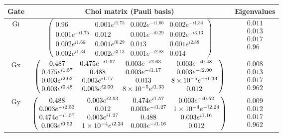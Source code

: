 {\begin{table}[h]
\begin{center}
\begin{tabular}[l]{|c|c|c|}
\hline
Gate & Choi matrix (Pauli basis) & Eigenvalues \\ \hline
Gi & $ \left(\!\!\begin{array}{cccc}
0.96 & 0.001e^{i1.75} & 0.002e^{-i1.66} & 0.002e^{-i1.34} \\ 
0.001e^{-i1.75} & 0.012 & 0.001e^{-i0.29} & 0.002e^{-i3.13} \\ 
0.002e^{i1.66} & 0.001e^{i0.29} & 0.013 & 0.001e^{i2.88} \\ 
0.002e^{i1.34} & 0.002e^{i3.13} & 0.001e^{-i2.88} & 0.014
 \end{array}\!\!\right) $
 & $ \begin{array}{c}
0.011 \\ 
0.013 \\ 
0.017 \\ 
0.96
 \end{array} $
 \\ \hline
Gx & $ \left(\!\!\begin{array}{cccc}
0.487 & 0.475e^{-i1.57} & 0.003e^{-i2.63} & 0.003e^{-i0.48} \\ 
0.475e^{i1.57} & 0.488 & 0.003e^{-i1.17} & 0.003e^{-i2.00} \\ 
0.003e^{i2.63} & 0.003e^{i1.17} & 0.013 & 8\times 10^{-5}e^{-i1.33} \\ 
0.003e^{i0.48} & 0.003e^{i2.00} & 8\times 10^{-5}e^{i1.33} & 0.012
 \end{array}\!\!\right) $
 & $ \begin{array}{c}
0.008 \\ 
0.013 \\ 
0.017 \\ 
0.962
 \end{array} $
 \\ \hline
Gy & $ \left(\!\!\begin{array}{cccc}
0.488 & 0.003e^{i2.53} & 0.474e^{i1.57} & 0.003e^{-i0.52} \\ 
0.003e^{-i2.53} & 0.012 & 0.003e^{-i1.27} & 1\times 10^{-4}e^{-i2.24} \\ 
0.474e^{-i1.57} & 0.003e^{i1.27} & 0.488 & 0.003e^{i1.16} \\ 
0.003e^{i0.52} & 1\times 10^{-4}e^{i2.24} & 0.003e^{-i1.16} & 0.012
 \end{array}\!\!\right) $
 & $ \begin{array}{c}
0.009 \\ 
0.012 \\ 
0.017 \\ 
0.962
 \end{array} $
 \\ \hline
\end{tabular}


\end{center}
\end{table}}
